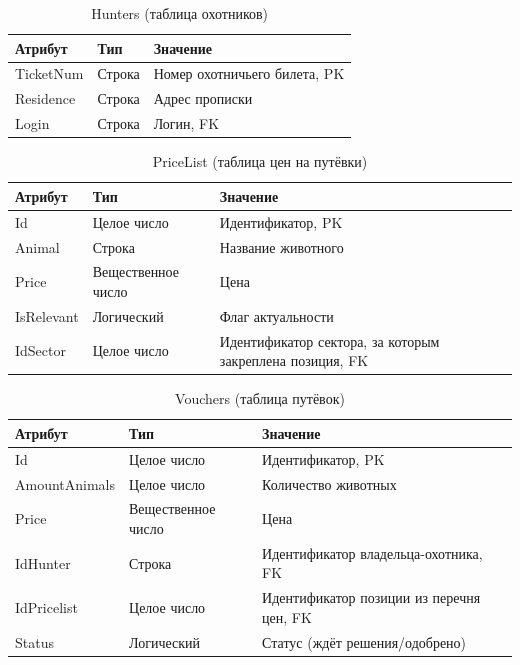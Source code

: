 	\begin{table}[pt!] 
		\begin{center}
			\caption{Hunters (таблица охотников)}
			\label{hunters_table}
			\begin{tabular}{| p{3cm} | p{3cm} | p{8cm} |}
				\hline
				\textbf{Атрибут} 	& \textbf{Тип} & \textbf{Значение} \\
				\hline
				TicketNum 			& Строка &	Номер охотничьего билета, PK\\
				\hline
				Residence			& Строка & 	Адрес прописки \\
				\hline
				Login	 			& Строка &	Логин, FK \\ 
				\hline
			\end{tabular}
		\end{center}
	\end{table}

	\begin{table}[pt!]
		\begin{center}
			\caption{PriceList (таблица цен на путёвки)}
			\label{price_table}
			\begin{tabular}{| p{3cm} | p{3cm} | p{8cm} |}
				\hline
				\textbf{Атрибут} 	& \textbf{Тип} & \textbf{Значение} \\
				\hline
				Id 					& Целое число &	Идентификатор, PK\\
				\hline
				Animal				& Строка & 	Название животного \\
				\hline
				Price	 			& Вещественное число &	Цена \\ 
				\hline
				IsRelevant	 		& Логический &	Флаг актуальности \\ 
				\hline
				IdSector	 		& Целое число &	Идентификатор сектора, за которым закреплена позиция, FK \\
				\hline
			\end{tabular}
		\end{center}
	\end{table}

	\begin{table}[pt!] 
		\begin{center}
			\caption{Vouchers (таблица путёвок)}
			\label{vouchers_table}
			\begin{tabular}{| p{3cm} | p{3cm} | p{8cm} |}
				\hline
				\textbf{Атрибут} 	& \textbf{Тип} & \textbf{Значение} \\
				\hline
				Id 					& Целое число &	Идентификатор, PK\\
				\hline
				AmountAnimals		& Целое число & 	Количество животных \\
				\hline
				Price	 			& Вещественное число &	Цена \\ 
				\hline
				IdHunter	 		& Строка &	Идентификатор владельца-охотника, FK \\ 
				\hline
				IdPricelist	 		& Целое число &	Идентификатор позиции из перечня цен, FK \\
				\hline
				Status				& Логический & 	Статус (ждёт решения/одобрено) \\
				\hline
			\end{tabular}
		\end{center}
	\end{table}

